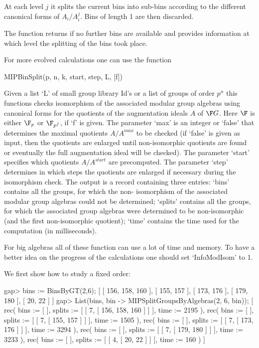 At each level $j$ it splits the current bins into sub-bins according 
to the different canonical forms of $A_i/A_i^j$. Bins of length 1 are 
then discarded.

The function returns if no further bins are available and provides
information at which level the splitting of the bins took place.

For more evolved calculations one can use the function

\> MIPBinSplit(p, n, k, start, step, L, [f])

Given a list `L' of small group library Id's or a list of groups of order $p^n$ this functions checks
isomorphism of the associated modular group algebras using canonical forms for the quotients of the
augmentation ideals $A$ of $\F G$. Here $\F$ is either $\F_p$ or $\F_{p^f}$, if `f' is given.
The parameter `max' is an integer or `false' that determines the maximal
quotients $A/A^{max}$ to be checked (if `false' is given as input, then the quotients are enlarged
until non-isomorphic quotients are found or eventually the full augmentation ideal will be checked).
The parameter `start' specifies which quotients $A/A^{start}$ are precomputed. The parameter
`step' determines in which steps the quotients are enlarged if necessary during the isomorphism check.
The output is a record containing three entries: `bins' contains all the groups, for which the non-
isomorphism of the associated modular group algebras could not be determined; `splits' contains all
the groups, for which the associated group algebras were determined to be non-isomorphic (and the
first non-isomorphic quotient); `time' contains the time used for the computation (in milliseconds).

For big algebras all of these function can use a lot of time and memory. To have a
better idea on the progress of the calculations one should set `InfoModIsom' to 1.

We first show how to study a fixed order:

\beginexample
gap> bins := BinsByGT(2,6);
[ [ 156, 158, 160 ], [ 155, 157 ], [ 173, 176 ], [ 179, 180 ], [ 20, 22 ] ]
gap> List(bins, bin -> MIPSplitGroupsByAlgebras(2, 6, bin));
[ rec( bins := [  ], splits := [ [ 7, [ 156, 158, 160 ] ] ], time := 2195 ), 
  rec( bins := [  ], splits := [ [ 7, [ 155, 157 ] ] ], time := 1505 ), 
  rec( bins := [  ], splits := [ [ 7, [ 173, 176 ] ] ], time := 3294 ), 
  rec( bins := [  ], splits := [ [ 7, [ 179, 180 ] ] ], time := 3233 ), 
  rec( bins := [  ], splits := [ [ 4, [ 20, 22 ] ] ], time := 160 ) ]
\endexample

